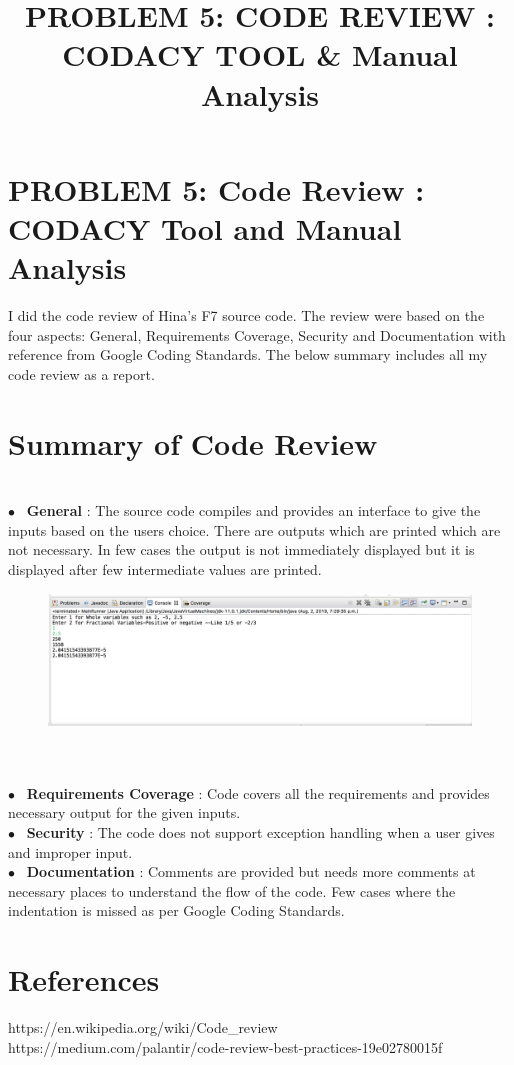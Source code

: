 \documentclass[10pt]{article}
\title{{\large\textbf{\normalsize PROBLEM 5: CODE REVIEW : CODACY TOOL & Manual Analysis}}}
\begin{document}
\section*{{PROBLEM 5: Code Review : CODACY Tool and Manual Analysis}}
    I did the code review of Hina's F7 source code. The review were based on the four aspects: General, Requirements Coverage, Security and Documentation with reference from Google Coding Standards. The below summary includes all my code review as a report.

\section*{\normalsize Summary of Code Review}
\\$\bullet$~ \textbf{General} : 
The source code compiles and provides an interface to give the inputs based on the users choice.  There are outputs which are printed which are not necessary. In few cases the output is not immediately displayed but it is displayed after few intermediate values are printed.
\begin{figure}[h]
\graphicspath{ {./Function6/}}
  \includegraphics[width=1.0\textwidth]{SS.png}

\end{figure}
\\
\\$\bullet$~ \textbf{Requirements Coverage} : 
Code covers all the requirements and provides necessary output for the given inputs. 
\\
$\bullet$~ \textbf{Security} :
The code does not support exception handling when a user gives and improper input.
\\
$\bullet$~ \textbf{Documentation} : 
Comments are provided but needs more comments at necessary places to understand the flow of the code. Few cases where the indentation is missed as per Google Coding Standards.

\section*{\normalsize References}
https://en.wikipedia.org/wiki/Code_review
\\
https://medium.com/palantir/code-review-best-practices-19e02780015f
\end{document}
